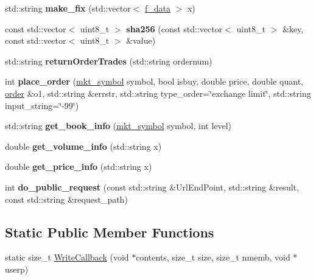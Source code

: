 \begin{DoxyCompactItemize}
std\+::string {\bfseries make\+\_\+fix} (std\+::vector$<$ \mbox{\hyperlink{structf__data}{f\+\_\+data}} $>$ x)
\item 
\mbox{\label{classclient__gdax_ac99bed19bf6b219dddb3f8b53d4a87ac}} 
const std\+::vector$<$ uint8\+\_\+t $>$ {\bfseries sha256} (const std\+::vector$<$ uint8\+\_\+t $>$ \&key, const std\+::vector$<$ uint8\+\_\+t $>$ \&value)
\item 
\mbox{\label{classclient__gdax_af3ecf2ad12ca9855a4f076c81c37c7fe}} 
std\+::string {\bfseries return\+Order\+Trades} (std\+::string ordernum)
\item 
\mbox{\label{classclient__gdax_a23b8769e187a810399bb856633e9c8bc}} 
int {\bfseries place\+\_\+order} (\mbox{\hyperlink{structmkt__symbol}{mkt\+\_\+symbol}} symbol, bool isbuy, double price, double quant, \mbox{\hyperlink{structorder}{order}} \&o1, std\+::string \&errstr, std\+::string type\+\_\+order=\char`\"{}exchange limit\char`\"{}, std\+::string input\+\_\+string=\char`\"{}-\/99\char`\"{})
\item 
\mbox{\label{classclient__gdax_a7caed201b1416de52ccaeab55ab3f6e2}} 
std\+::string {\bfseries get\+\_\+book\+\_\+info} (\mbox{\hyperlink{structmkt__symbol}{mkt\+\_\+symbol}} symbol, int level)
\item 
\mbox{\label{classclient__gdax_a314ec11641d65d5a527f181103d65f44}} 
double {\bfseries get\+\_\+volume\+\_\+info} (std\+::string x)
\item 
\mbox{\label{classclient__gdax_a7f2155ab8f30e4cb0c15becc689bc78f}} 
double {\bfseries get\+\_\+price\+\_\+info} (std\+::string x)
\item 
\mbox{\label{classclient__gdax_af4d5e2613843e2e2cd074620209389e9}} 
int {\bfseries do\+\_\+public\+\_\+request} (const std\+::string \&Url\+End\+Point, std\+::string \&result, const std\+::string \&request\+\_\+path)
\end{DoxyCompactItemize}
\subsection*{Static Public Member Functions}
\begin{DoxyCompactItemize}
\item 
static size\+\_\+t \mbox{\hyperlink{classclient__gdax_aa0cc262133e3443dcf8c0fcbd87a2310}{Write\+Callback}} (void $\ast$contents, size\+\_\+t size, size\+\_\+t nmemb, void $\ast$userp)
\end{DoxyCompactItemize}
